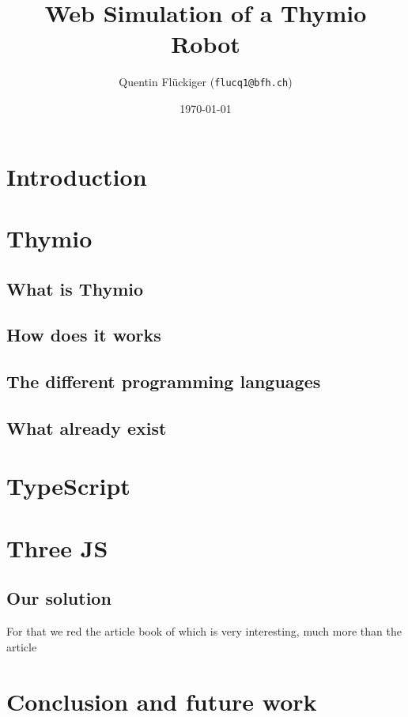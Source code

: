 \documentclass{scrartcl}
\begin{document}
\title{Web Simulation of a Thymio Robot}
\date{\today}   %
\author{Quentin Flückiger (\texttt{flucq1@bfh.ch})}
\maketitle
\tableofcontents
\clearpage

\section{Introduction}
\lipsum[1-5]

\section{Thymio}
\subsection{What is Thymio}
\subsection{How does it works}
\subsection{The different programming languages}
\subsection{What already exist} 

\section{TypeScript}
\section{Three JS}

\subsection{Our solution}

For that we red the article book of \cite{Jerald:2015:VBH:2792790}
which is very interesting, much more than the article
\cite{Diniz:2017:UGO:3100317.3100324}

\section{Conclusion and future work}
\end{document}

